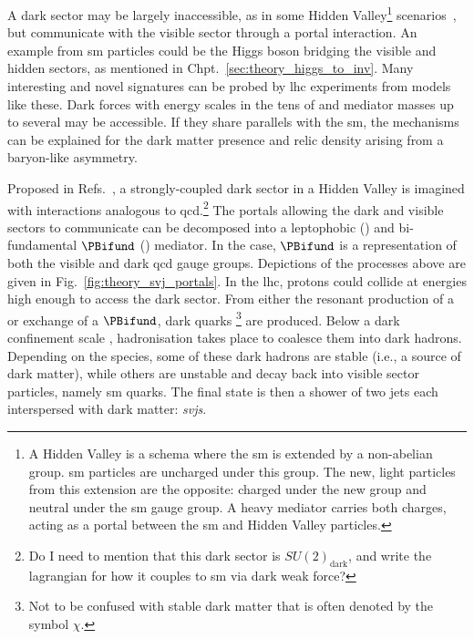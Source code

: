A dark sector may be largely inaccessible, as in some Hidden Valley\footnote{A Hidden Valley is a schema where the \acrlong{sm} is extended by a non-abelian group. \acrshort{sm} particles are uncharged under this group. The new, light particles from this extension are the opposite: charged under the new group and neutral under the \acrshort{sm} gauge group. A heavy mediator carries both charges, acting as a portal between the \acrlong{sm} and Hidden Valley particles.} scenarios~\cite{Strassler:2006im}, but communicate with the visible sector through a portal interaction. An example from \acrshort{sm} particles could be the Higgs boson bridging the visible and hidden sectors, as mentioned in Chpt.~\ref{sec:theory_higgs_to_inv}. Many interesting and novel signatures can be probed by \acrshort{lhc} experiments from models like these. Dark forces with energy scales in the tens of \GeVns and mediator masses up to several \TeVns may be accessible. If they share parallels with the \acrlong{sm}, the mechanisms can be explained for the dark matter presence and relic density arising from a baryon-like asymmetry.

Proposed in Refs.~, a strongly-coupled dark sector in a Hidden Valley is imagined with interactions analogous to \acrshort{qcd}.\footnote{Do I need to mention that this dark sector is $SU(2)_{\mathrm{dark}}$, and write the lagrangian for how it couples to \acrshort{sm} via dark weak force?} The portals allowing the dark and visible sectors to communicate can be decomposed into a leptophobic \PZprime (\schannel) and bi-fundamental $\PBifund$ (\tchannel) mediator. In the \tchannel case, $\PBifund$ is a representation of both the visible and dark \acrshort{qcd} gauge groups. Depictions of the processes above are given in Fig.~\ref{fig:theory_svj_portals}. In the \acrshort{lhc}, protons could collide at energies high enough to access the dark sector. From either the resonant production of a \PZprime or exchange of a $\PBifund$, dark quarks \Pqdark\footnote{Not to be confused with stable dark matter that is often denoted by the symbol $\chi$.} are produced. Below a dark confinement scale \lamDark, hadronisation takes place to coalesce them into dark hadrons. Depending on the species, some of these dark hadrons are stable (i.e., a source of dark matter), while others are unstable and decay back into visible sector particles, namely \acrlong{sm} quarks. The final state is then a shower of two \glspl{jet} each interspersed with dark matter: \emph{\glspl{svj}}.

